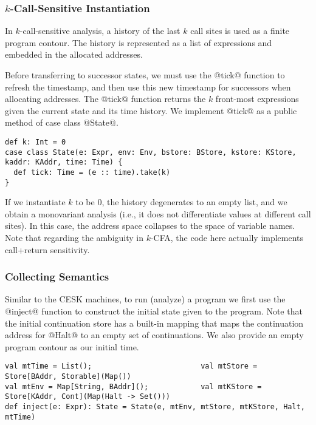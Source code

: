 \documentclass[acmsmall]{acmart}\settopmatter{}
\begin{document}
\subsubsection{$k$-Call-Sensitive Instantiation} \label{kcfainst}

In $k$-call-sensitive analysis, a history of the last $k$ call sites is used as a 
finite program contour. The history is represented as a list of expressions and embedded
in the allocated addresses.

Before transferring to successor states, we must use the @tick@ function to refresh the 
timestamp, and then use this new timestamp for successors when allocating addresses.
The @tick@ function returns the $k$ front-most expressions given the current state and its
time history. We implement @tick@ as a public method of case class @State@.

\begin{lstlisting}
def k: Int = 0
case class State(e: Expr, env: Env, bstore: BStore, kstore: KStore, kaddr: KAddr, time: Time) {
  def tick: Time = (e :: time).take(k)
}
\end{lstlisting}

If we instantiate $k$ to be $0$, the history degenerates to an empty list, and we obtain
a monovariant analysis (i.e., it does not differentiate values at different call sites).
In this case, the address space collapses to the space of variable names.
Note that regarding the ambiguity in $k$-CFA\cite{Gilray:2016:ACP:2951913.2951936},
the code here actually implements call+return sensitivity.

\subsubsection{Collecting Semantics}

Similar to the CESK machines, to run (analyze) a program we first use the @inject@ function
to construct the initial state given to the program. Note that the initial continuation store
has a built-in mapping that maps the continuation address for @Halt@ to an empty set of 
continuations. We also provide an empty program contour as our initial time.

\begin{lstlisting}
val mtTime = List();                         val mtStore = Store[BAddr, Storable](Map())
val mtEnv = Map[String, BAddr]();            val mtKStore = Store[KAddr, Cont](Map(Halt -> Set()))
def inject(e: Expr): State = State(e, mtEnv, mtStore, mtKStore, Halt, mtTime)
\end{lstlisting}
\end{document}

